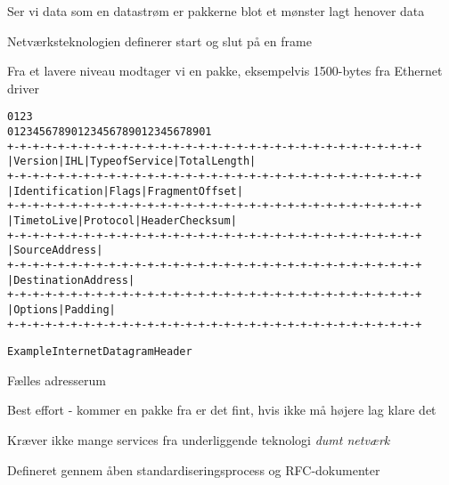 \documentclass[Screen16to9,17pt]{foils}
\begin{document}
\begin{list1}
\item Ser vi data som en datastrøm er pakkerne blot et mønster lagt henover data
\item Netværksteknologien definerer start og slut på en frame
\item Fra et lavere niveau modtager vi en pakke, eksempelvis 1500-bytes fra Ethernet driver
\end{list1}




\begin{alltt}
\small
    0                   1                   2                   3
    0 1 2 3 4 5 6 7 8 9 0 1 2 3 4 5 6 7 8 9 0 1 2 3 4 5 6 7 8 9 0 1
   +-+-+-+-+-+-+-+-+-+-+-+-+-+-+-+-+-+-+-+-+-+-+-+-+-+-+-+-+-+-+-+-+
   |Version|  IHL  |Type of Service|          Total Length         |
   +-+-+-+-+-+-+-+-+-+-+-+-+-+-+-+-+-+-+-+-+-+-+-+-+-+-+-+-+-+-+-+-+
   |         Identification        |Flags|      Fragment Offset    |
   +-+-+-+-+-+-+-+-+-+-+-+-+-+-+-+-+-+-+-+-+-+-+-+-+-+-+-+-+-+-+-+-+
   |  Time to Live |    Protocol   |         Header Checksum       |
   +-+-+-+-+-+-+-+-+-+-+-+-+-+-+-+-+-+-+-+-+-+-+-+-+-+-+-+-+-+-+-+-+
   |                       Source Address                          |
   +-+-+-+-+-+-+-+-+-+-+-+-+-+-+-+-+-+-+-+-+-+-+-+-+-+-+-+-+-+-+-+-+
   |                    Destination Address                        |
   +-+-+-+-+-+-+-+-+-+-+-+-+-+-+-+-+-+-+-+-+-+-+-+-+-+-+-+-+-+-+-+-+
   |                    Options                    |    Padding    |
   +-+-+-+-+-+-+-+-+-+-+-+-+-+-+-+-+-+-+-+-+-+-+-+-+-+-+-+-+-+-+-+-+

                    Example Internet Datagram Header
\end{alltt}



\begin{list1}
\item Fælles adresserum
\item Best effort - kommer en pakke fra er det fint, hvis ikke må højere lag klare det
\item Kræver ikke mange services fra underliggende teknologi \emph{dumt netværk}
\item Defineret gennem åben standardiseringsprocess og RFC-dokumenter
\end{list1}
\end{document}
